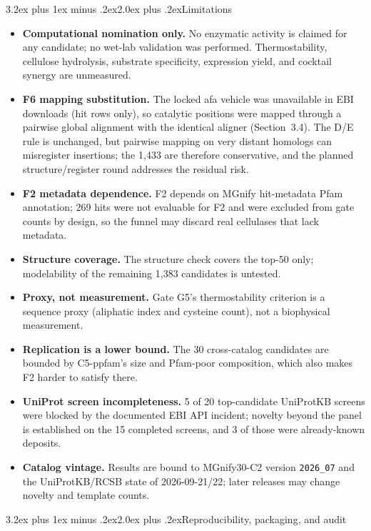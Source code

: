 \documentclass[11pt]{article}
\makeatletter
\renewcommand{\section}{\@startsection{section}{1}{\z@}%
  {3.2ex plus 1ex minus .2ex}{2.0ex plus .2ex}{\Large\bfseries\color{navy}}}
\makeatother
\begin{document}
\section{Limitations}
\begin{itemize}
\item \textbf{Computational nomination only.} No enzymatic activity is claimed for any candidate; no wet-lab validation was performed. Thermostability, cellulose hydrolysis, substrate specificity, expression yield, and cocktail synergy are unmeasured.
\item \textbf{F6 mapping substitution.} The locked afa vehicle was unavailable in EBI downloads (hit rows only), so catalytic positions were mapped through a pairwise global alignment with the identical aligner (Section~3.4). The D/E rule is unchanged, but pairwise mapping on very distant homologs can misregister insertions; the 1,433 are therefore conservative, and the planned structure/register round addresses the residual risk.
\item \textbf{F2 metadata dependence.} F2 depends on MGnify hit-metadata Pfam annotation; 269 hits were not evaluable for F2 and were excluded from gate counts by design, so the funnel may discard real cellulases that lack metadata.
\item \textbf{Structure coverage.} The structure check covers the top-50 only; modelability of the remaining 1,383 candidates is untested.
\item \textbf{Proxy, not measurement.} Gate G5's thermostability criterion is a sequence proxy (aliphatic index and cysteine count), not a biophysical measurement.
\item \textbf{Replication is a lower bound.} The 30 cross-catalog candidates are bounded by C5-ppfam's size and Pfam-poor composition, which also makes F2 harder to satisfy there.
\item \textbf{UniProt screen incompleteness.} 5 of 20 top-candidate UniProtKB screens were blocked by the documented EBI API incident; novelty beyond the panel is established on the 15 completed screens, and 3 of those were already-known deposits.
\item \textbf{Catalog vintage.} Results are bound to MGnify30-C2 version \texttt{2026\_07} and the UniProtKB/RCSB state of 2026-09-21/22; later releases may change novelty and template counts.
\end{itemize}

\section{Reproducibility, packaging, and audit}
\end{document}
